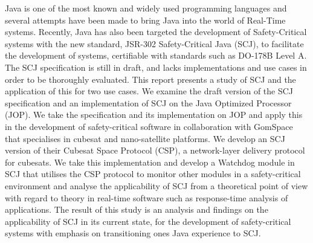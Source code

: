 Java is one of the most known and widely used programming languages and several attempts have been made to bring Java into the world of Real-Time systems. Recently, Java has also been targeted the development of Safety-Critical systems with the new standard, JSR-302 Safety-Critical Java (SCJ), to facilitate the development of systems, certifiable with standards such as DO-178B Level A. The SCJ specification is still in draft, and lacks implementations and use cases in order to be thoroughly evaluated. This report presents a study of SCJ and the application of this for two use cases.
We examine the draft version of the SCJ specification and an implementation of SCJ on the Java Optimized Processor (JOP). We take the specification and its implementation on JOP and apply this in the development of safety-critical software in collaboration with GomSpace that specialises in cubesat and nano-satellite platforms. We develop an SCJ version of their Cubesat Space Protocol (CSP), a network-layer delivery protocol for cubesats. We take this implementation and develop a Watchdog module in SCJ that utilises the CSP protocol to monitor other modules in a safety-critical environment and analyse the applicability of SCJ from a theoretical point of view with regard to theory in real-time software such as response-time analysis of applications.
The result of this study is an analysis and findings on the applicability of SCJ in its current state, for the development of safety-critical systems with emphasis on transitioning ones Java experience to SCJ.